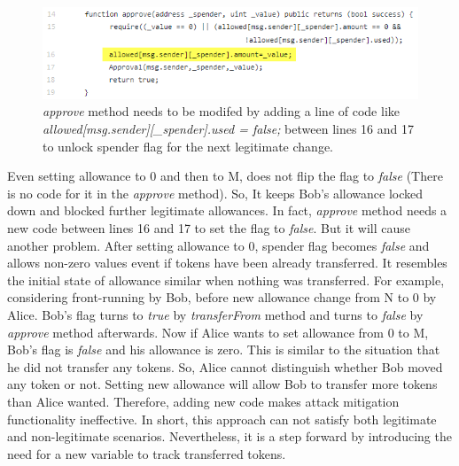 \begin{figure}[H]
	\centering
	\includegraphics[width=1.0\linewidth]{figures/multiple_withdrawal_33.png}
	\caption{\textit{approve} method needs to be modifed by adding a line of code like \textit{allowed[msg.sender][\_spender].used = false;} between lines 16 and 17 to unlock spender flag for the next legitimate change.}
\end{figure}
\noindent Even setting allowance to 0 and then to M, does not flip the flag to \textit{false} (There is no code for it in the \textit{approve} method). So, It keeps Bob’s allowance locked down and blocked further legitimate allowances. In fact, \textit{approve} method needs a new code between lines 16 and 17 to set the flag to \textit{false}. But it will cause another problem. After setting allowance to 0, spender flag becomes \textit{false} and allows non-zero values event if tokens have been already transferred. It resembles the initial state of allowance similar when nothing was transferred. For example, considering front-running by Bob, before new allowance change from N to 0 by Alice. Bob's flag turns to \textit{true} by \textit{transferFrom} method and turns to \textit{false} by \textit{approve} method afterwards. Now if Alice wants to set allowance from 0 to M, Bob's flag is \textit{false} and his allowance is zero. This is similar to the situation that he did not transfer any tokens. So, Alice cannot distinguish whether Bob moved any token or not. Setting new allowance will allow Bob to transfer more tokens than Alice wanted. Therefore, adding new code makes attack mitigation functionality ineffective. In short, this approach can not satisfy both legitimate and non-legitimate scenarios. Nevertheless, it is a step forward by introducing the need for a new variable to track transferred tokens.

